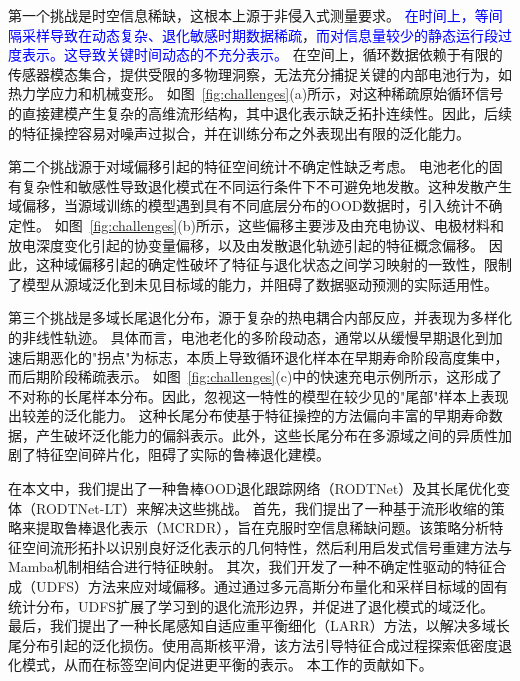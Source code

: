 \documentclass[UTF8,lettersize,journal]{IEEEtran}
\newcommand{\rev}[1]{\textcolor{blue}{#1}}
\begin{document}
第一个挑战是时空信息稀缺，这根本上源于非侵入式测量要求。
% 
\rev{在时间上，等间隔采样导致在动态复杂、退化敏感时期数据稀疏}\cite{9648002, BOSE2023107543, zhu2022data, GUAN2018204, XIONG2020110048}，\rev{而对信息量较少的静态运行段过度表示。这导致关键时间动态的不充分表示。}
% 
在空间上，循环数据依赖于有限的传感器模态集合，提供受限的多物理洞察，无法充分捕捉关键的内部电池行为，如热力学应力\cite{XIONG2020110048}和机械变形\cite{zeng2023nonintrusive}。
% 
如图~\ref{fig:challenges}(a)所示，对这种稀疏原始循环信号的直接建模产生复杂的高维流形结构，其中退化表示缺乏拓扑连续性。因此，后续的特征操控容易对噪声过拟合，并在训练分布之外表现出有限的泛化能力。

第二个挑战源于对域偏移引起的特征空间统计不确定性缺乏考虑。
% 
电池老化的固有复杂性和敏感性\cite{LI2024155588}导致退化模式在不同运行条件下不可避免地发散。这种发散产生域偏移，当源域训练的模型遇到具有不同底层分布的OOD数据时，引入统计不确定性\cite{9577663, pmlr-v202-dai23d, liuncertainty}。
% 
如图~\ref{fig:challenges}(b)所示，这些偏移主要涉及由充电协议、电极材料和放电深度变化引起的协变量偏移，以及由发散退化轨迹引起的特征概念偏移。
% 
因此，这种域偏移引起的确定性破坏了特征与退化状态之间学习映射的一致性，限制了模型从源域泛化到未见目标域的能力，并阻碍了数据驱动预测的实际适用性。

第三个挑战是多域长尾退化分布，源于复杂的热电耦合内部反应，并表现为多样化的非线性轨迹。
%
具体而言，电池老化的多阶段动态，通常以从缓慢早期退化到加速后期恶化的"拐点"为标志，本质上导致循环退化样本在早期寿命阶段高度集中，而后期阶段稀疏表示。
% 
如图~\ref{fig:challenges}(c)中的快速充电示例所示，这形成了不对称的长尾样本分布。因此，忽视这一特性的模型在较少见的"尾部"样本上表现出较差的泛化能力。
% 
这种长尾分布使基于特征操控的方法偏向丰富的早期寿命数据，产生破坏泛化能力的偏斜表示。此外，这些长尾分布在多源域之间的异质性加剧了特征空间碎片化，阻碍了实际的鲁棒退化建模。

在本文中，我们提出了一种鲁棒OOD退化跟踪网络（RODTNet）及其长尾优化变体（RODTNet-LT）来解决这些挑战。
% 
首先，我们提出了一种基于流形收缩的策略来提取鲁棒退化表示（MCRDR），旨在克服时空信息稀缺问题。该策略分析特征空间流形拓扑以识别良好泛化表示的几何特性，然后利用启发式信号重建方法与Mamba机制相结合进行特征映射。
% 
其次，我们开发了一种不确定性驱动的特征合成（UDFS）方法来应对域偏移。通过通过多元高斯分布量化和采样目标域的固有统计分布，UDFS扩展了学习到的退化流形边界，并促进了退化模式的域泛化。
% 
最后，我们提出了一种长尾感知自适应重平衡细化（LARR）方法，以解决多域长尾分布引起的泛化损伤。使用高斯核平滑，该方法引导特征合成过程探索低密度退化模式，从而在标签空间内促进更平衡的表示。
% 
本工作的贡献如下。
\end{document}
